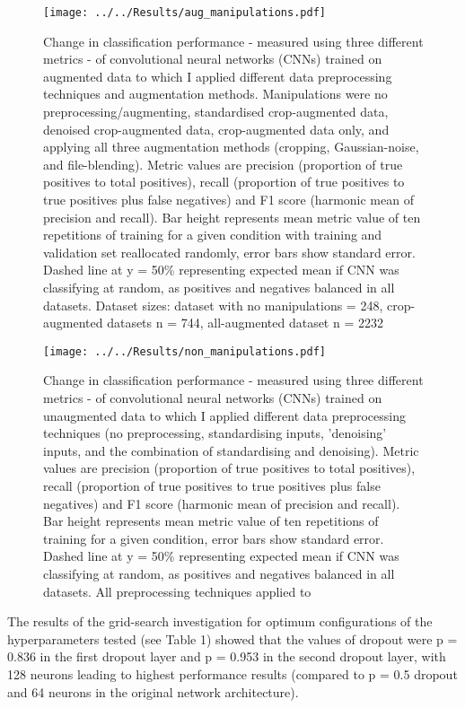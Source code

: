 \documentclass[11pt]{article}
\begin{document}
\begin{figure}[h!]
	\centering
	\texttt{[image: ../../Results/aug\_manipulations.pdf]}
	\caption{Change in classification performance - measured using three different metrics - of convolutional neural networks (CNNs) trained on augmented data to which I applied different data preprocessing techniques and augmentation methods. Manipulations were no preprocessing/augmenting, standardised crop-augmented data, denoised crop-augmented data, crop-augmented data only, and applying all three augmentation methods (cropping, Gaussian-noise, and file-blending). Metric values are precision (proportion of true positives to total positives), recall (proportion of true positives to true positives plus false negatives) and F1 score (harmonic mean of precision and recall). Bar height represents mean metric value of ten repetitions of training for a given condition with training and validation set reallocated randomly, error bars show standard error. Dashed line at y = 50\% representing expected mean if CNN was classifying at random, as positives and negatives balanced in all datasets. Dataset sizes: dataset with no manipulations = 248, crop-augmented datasets n = 744, all-augmented dataset n = 2232}
	\label{manipulationsonaug}
\end{figure}
\begin{figure}[h!]
	\centering
	\texttt{[image: ../../Results/non\_manipulations.pdf]}
	\caption{Change in classification performance - measured using three different metrics - of convolutional neural networks (CNNs) trained on unaugmented data to which I applied different data preprocessing techniques (no preprocessing, standardising inputs, 'denoising' inputs, and the combination of standardising and denoising). Metric values are precision (proportion of true positives to total positives), recall (proportion of true positives to true positives plus false negatives) and F1 score (harmonic mean of precision and recall). Bar height represents mean metric value of ten repetitions of training for a given condition, error bars show standard error. Dashed line at y = 50\% representing expected mean if CNN was classifying at random, as positives and negatives balanced in all datasets. All preprocessing techniques applied to }
	\label{manipulationsonnon}
\end{figure}

The results of the grid-search investigation for optimum configurations of the hyperparameters tested (see Table 1) showed that the values of dropout were p = 0.836 in the first dropout layer and p = 0.953 in the second dropout layer, with 128 neurons leading to highest performance results (compared to p = 0.5 dropout and 64 neurons in the original network architecture).  
\end{document}
